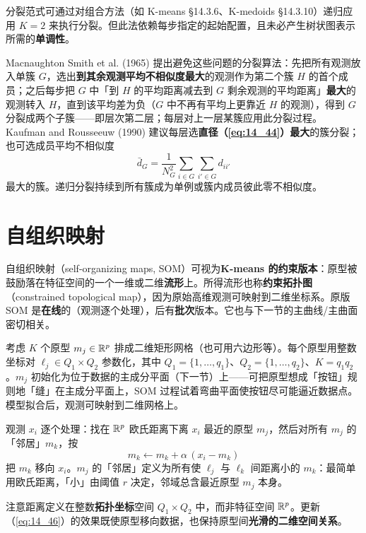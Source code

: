 分裂范式可通过对组合方法（如 K-means §14.3.6、K-medoids §14.3.10）递归应用 $K=2$ 来执行分裂。但此法依赖每步指定的起始配置，且未必产生树状图表示所需的\textbf{单调性}。

Macnaughton Smith et al. (1965) 提出避免这些问题的分裂算法：先把所有观测放入单簇 $G$，选出\textbf{到其余观测平均不相似度最大}的观测作为第二个簇 $H$ 的首个成员；之后每步把 $G$ 中「到 $H$ 的平均距离减去到 $G$ 剩余观测的平均距离」\textbf{最大}的观测转入 $H$，直到该平均差为负（$G$ 中不再有平均上更靠近 $H$ 的观测），得到 $G$ 分裂成两个子簇——即层次第二层；每层对上一层某簇应用此分裂过程。Kaufman and Rousseeuw (1990) 建议每层选\textbf{直径（\eqref{eq:14_44}）最大}的簇分裂；也可选成员平均不相似度
\[
\bar d_G = \frac{1}{N_G^2}\sum_{i\in G}\sum_{i'\in G} d_{ii'}
\]
最大的簇。递归分裂持续到所有簇成为单例或簇内成员彼此零不相似度。

\section{自组织映射}

自组织映射（self-organizing maps, SOM）可视为\textbf{K-means 的约束版本}：原型被鼓励落在特征空间的一个一维或二维\textbf{流形}上。所得流形也称\textbf{约束拓扑图}（constrained topological map），因为原始高维观测可映射到二维坐标系。原版 SOM 是\textbf{在线}的（观测逐个处理），后有\textbf{批次}版本。它也与下一节的主曲线/主曲面密切相关。

考虑 $K$ 个原型 $m_j\in\mathbb{R}^p$ 排成二维矩形网格（也可用六边形等）。每个原型用整数坐标对 $\ell_j\in Q_1\times Q_2$ 参数化，其中 $Q_1=\{1,\dots,q_1\}$、$Q_2=\{1,\dots,q_2\}$、$K=q_1q_2$。$m_j$ 初始化为位于数据的主成分平面（下一节）上——可把原型想成「按钮」规则地「缝」在主成分平面上，SOM 过程试着弯曲平面使按钮尽可能逼近数据点。模型拟合后，观测可映射到二维网格上。

观测 $x_i$ 逐个处理：找在 $\mathbb{R}^p$ 欧氏距离下离 $x_i$ 最近的原型 $m_j$，然后对所有 $m_j$ 的「邻居」$m_k$，按
\begin{equation}
m_k \leftarrow m_k + \alpha\,(x_i - m_k) \label{eq:14_46}
\end{equation}
把 $m_k$ 移向 $x_i$。$m_j$ 的「邻居」定义为所有使 $\ell_j$ 与 $\ell_k$ 间距离小的 $m_k$：最简单用欧氏距离，「小」由阈值 $r$ 决定，邻域总含最近原型 $m_j$ 本身。

注意距离定义在整数\textbf{拓扑坐标}空间 $Q_1\times Q_2$ 中，而非特征空间 $\mathbb{R}^p$。更新（\eqref{eq:14_46}）的效果既使原型移向数据，也保持原型间\textbf{光滑的二维空间关系}。

